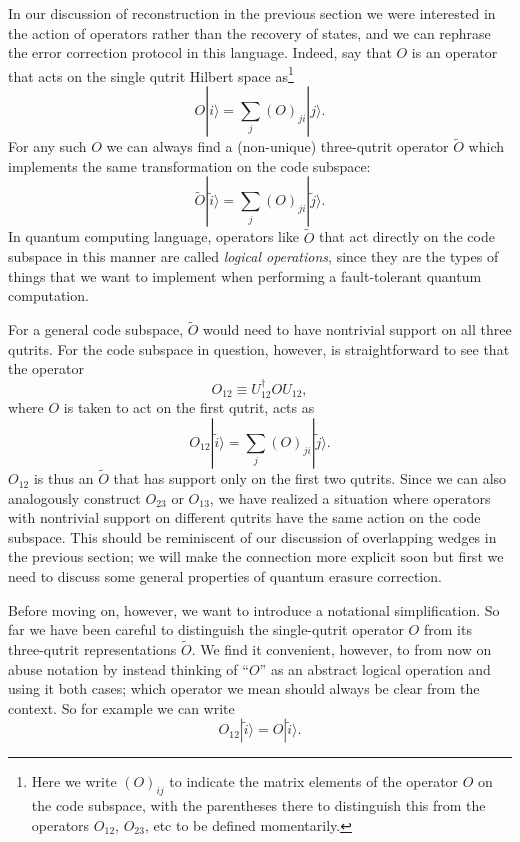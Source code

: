\documentclass[12pt]{article}
\newcommand{\be}{\begin{equation}}
\newcommand{\ee}{\end{equation}}
\newcommand{\ran}{\rangle}
\newcommand{\wt}{\widetilde}
\begin{document}
In our discussion of reconstruction in the previous section we were interested in the action of operators rather than the recovery of states, and we can rephrase the error correction protocol in this language.  Indeed, say that $O$ is an operator that acts on the single qutrit Hilbert space as\footnote{Here we write $(O)_{ij}$ to indicate the matrix elements of the operator $O$ on the code subspace, with the parentheses there to distinguish this from the operators $O_{12}$, $O_{23}$, etc to be defined momentarily.} 
\be\label{Odef}
O|i\ran=\sum_{j}(O)_{ji}|j\ran.
\ee
For any such $O$ we can always find a (non-unique) three-qutrit operator $\wt{O}$ which implements the same transformation on the code subspace:
\be
\wt{O}|\wt{i}\ran=\sum_{j}(O)_{ji}|\wt{j}\ran.
\ee
In quantum computing language, operators like $\wt{O}$ that act directly on the code subspace in this manner are called \textit{logical operations}, since they are the types of things that we want to implement when performing a fault-tolerant quantum computation. 

For a general code subspace, $\wt{O}$ would need to have nontrivial support on all three qutrits.  For the code subspace in question, however, is straightforward to see that the operator
\be
O_{12}\equiv U_{12}^\dagger O U_{12},
\ee
where $O$ is taken to act on the first qutrit, acts as
\be
O_{12}|\wt{i}\ran=\sum_j (O)_{ji}|\wt{j}\ran.
\ee
$O_{12}$ is thus an $\wt{O}$ that has support only on the first two qutrits.  Since we can also analogously construct $O_{23}$ or $O_{13}$, we have realized a situation where operators with nontrivial support on different qutrits have the same action on the code subspace.  This should be reminiscent of our discussion of overlapping wedges in the previous section; we will make the connection more explicit soon but first we need to discuss some general properties of quantum erasure correction.

Before moving on, however, we want to introduce a notational simplification.  So far we have been careful to distinguish the single-qutrit operator $O$ from its three-qutrit representations $\wt{O}$.  We find it convenient, however, to from now on abuse notation by instead thinking of ``$O$'' as an abstract logical operation and using it both cases; which operator we mean should always be clear from the context.  So for example we can write
\be
O_{12}|\wt{i}\ran=O|\wt{i}\ran.
\ee
\end{document}
